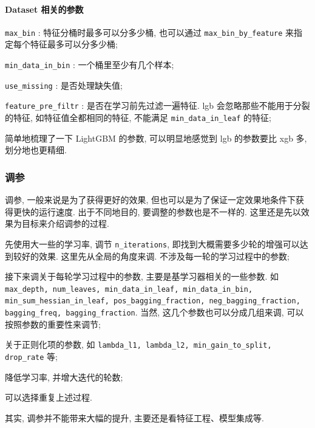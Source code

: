 \paragraph{Dataset 相关的参数}
\begin{myitemize}
	\item \texttt{max_bin} : 特征分桶时最多可以分多少桶, 也可以通过 \texttt{max_bin_by_feature} 来指定每个特征最多可以分多少桶;
	
	\item \texttt{min_data_in_bin} : 一个桶里至少有几个样本;
	
	\item \texttt{use_missing} : 是否处理缺失值;
	
	\item \texttt{feature_pre_filtr} : 是否在学习前先过滤一遍特征. lgb 会忽略那些不能用于分裂的特征, 如特征值全都相同的特征, 不能满足 \texttt{min_data_in_leaf} 的特征;
\end{myitemize}

简单地梳理了一下 LightGBM 的参数, 可以明显地感觉到 lgb 的参数要比 xgb 多, 划分地也更精细.

\subsubsection{调参}
调参, 一般来说是为了获得更好的效果, 但也可以是为了保证一定效果地条件下获得更快的运行速度. 出于不同地目的, 要调整的参数也是不一样的. 这里还是先以效果为目标来介绍调参的过程.
\begin{myenumerate}
	\item 先使用大一些的学习率, 调节 \texttt{n_iterations}, 即找到大概需要多少轮的增强可以达到较好的效果. 这里先从全局的角度来调. 不涉及每一轮的学习过程中的参数;
	
	\item 接下来调关于每轮学习过程中的参数, 主要是基学习器相关的一些参数. 如 \texttt{max_depth, num_leaves, min_data_in_leaf, min_data_in_bin, min_sum_hessian_in_leaf, pos_bagging_fraction, neg_bagging_fraction, bagging_freq, bagging_fraction}. 当然, 这几个参数也可以分成几组来调, 可以按照参数的重要性来调节;	
	
	\item 关于正则化项的参数, 如 \texttt{lambda_l1, lambda_l2, min_gain_to_split, drop_rate} 等;
	
	\item 降低学习率, 并增大迭代的轮数;
	
	\item 可以选择重复上述过程.
\end{myenumerate}
其实, 调参并不能带来大幅的提升, 主要还是看特征工程、模型集成等.

